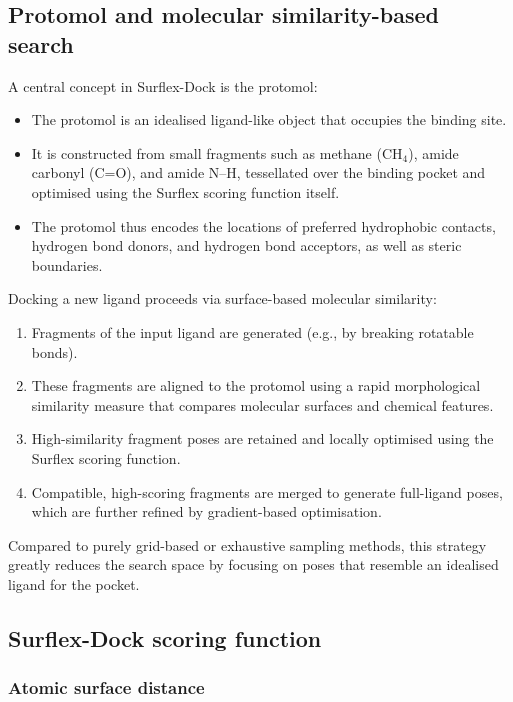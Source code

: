 \documentclass[12pt]{article}
\begin{document}
\subsection{Protomol and molecular similarity-based search}

A central concept in Surflex-Dock is the protomol\cite{CH7_Jain2003Surflex}:
\begin{itemize}
  \item The protomol is an idealised ligand-like object that occupies the binding site.
  \item It is constructed from small fragments such as methane (CH$_4$), amide carbonyl (C=O), and amide N--H, tessellated over the binding pocket and optimised using the Surflex scoring function itself.
  \item The protomol thus encodes the locations of preferred hydrophobic contacts, hydrogen bond donors, and hydrogen bond acceptors, as well as steric boundaries.
\end{itemize}

Docking a new ligand proceeds via surface-based molecular similarity:
\begin{enumerate}
  \item Fragments of the input ligand are generated (e.g., by breaking rotatable bonds).
  \item These fragments are aligned to the protomol using a rapid morphological similarity measure that compares molecular surfaces and chemical features.
  \item High-similarity fragment poses are retained and locally optimised using the Surflex scoring function.
  \item Compatible, high-scoring fragments are merged to generate full-ligand poses, which are further refined by gradient-based optimisation.
\end{enumerate}

Compared to purely grid-based or exhaustive sampling methods, this strategy greatly reduces the search space by focusing on poses that resemble an idealised ligand for the pocket.

\subsection{Surflex-Dock scoring function}

\subsubsection{Atomic surface distance}
\end{document}
